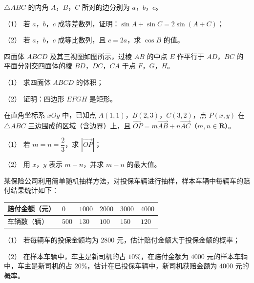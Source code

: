 \begin{question}
$\triangle ABC$ 的内角 $A$，$B$，$C$ 所对的边分别为 $a$，$b$，$c$。

（1） 若 $a$，$b$，$c$ 成等差数列，证明：$\sin A+\sin C=2\sin(A+C)$；

（2） 若 $a$，$b$，$c$ 成等比数列，且 $c=2a$，求 $\cos B$ 的值。

\Needspace{0.4\textheight}
\end{question}
\begin{question}
四面体 $ABCD$ 及其三视图如图所示，过棱 $AB$ 的中点 $E$ 作平行于 $AD$，$BC$ 的平面分别交四面体的棱 $BD$，$DC$，$CA$ 于点 $F$，$G$，$H$。
\nopagebreak[4]
\begin{center}\end{center}
\nopagebreak[4]
（1） 求四面体 $ABCD$ 的体积；

（2） 证明：四边形 $EFGH$ 是矩形。

\end{question}
\begin{question}
在直角坐标系 $xOy$ 中，已知点 $A(1,1)$，$B(2,3)$，$C(3,2)$，点 $P(x,y)$ 在 $\triangle ABC$ 三边围成的区域（含边界）上，且 $\overrightarrow{OP}=m\overrightarrow{AB}+n\overrightarrow{AC}$（$m,n\in\mathbf R$）。

（1） 若 $m=n=\dfrac23$，求 $|\overrightarrow{OP}|$；

（2） 用 $x$，$y$ 表示 $m-n$，并求 $m-n$ 的最大值。

\end{question}
\begin{question}
某保险公司利用简单随机抽样方法，对投保车辆进行抽样，样本车辆中每辆车的赔付结果统计如下：

\begin{center}
\begin{tabular}{llllll}
\toprule
赔付金额（元） & $0$ & $1000$ & $2000$ & $3000$ & $4000$ \\
\midrule
车辆数（辆） & $500$ & $130$ & $100$ & $150$ & $120$ \\
\bottomrule
\end{tabular}
\end{center}

（1） 若每辆车的投保金额均为 $2800$ 元，估计赔付金额大于投保金额的概率；

（2） 在样本车辆中，车主是新司机的占 $10\%$，在赔付金额为 $4000$ 元的样本车辆中，车主是新司机的占 $20\%$，估计在已投保车辆中，新司机获赔金额为 $4000$ 元的概率。

\Needspace{0.4\textheight}
\end{question}
